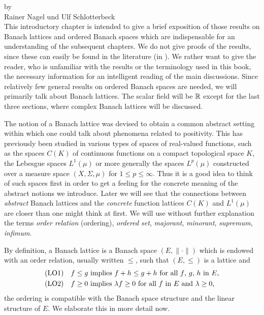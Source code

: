 \label{chap:c1}%
{\Large
\vspace*{-.75cm}
by \\[.25em]
Rainer Nagel und Ulf Schlotterbeck
\vspace{.75cm}
\\
}
This introductory chapter is intended to give a brief exposition of those results on Banach lattices and ordered Banach spaces which are indispensable for an understanding of the subsequent chapters.
We do not give proofs of the results, since these can easily be found in the literature (\eg in \citet{schaefer:1974}).
We rather want to give the reader, who is unfamiliar with the results or the terminology used in this book, the necessary information for an intelligent reading of the main discussions.
Since relatively few general results on ordered Banach spaces are needed, we will primarily talk about Banach lattices.
The scalar field will be $\mathbb{R}$ except for the last three sections, where complex Banach lattices will be discussed.

The notion of a Banach lattice was devised to obtain a common abstract setting within which one could talk about phenomena related to positivity.
This has previously been studied in various types of spaces of real-valued functions, such as the spaces $ C(K) $ of continuous functions on a compact topological space $ K $, the Lebesgue spaces $ L^{1}(\mu) $ or more generally the spaces $ L^{p}(\mu) $ constructed over a measure space $ (X,\Sigma,\mu) $ for $ 1 \leq p \leq \infty $.
Thus it is a good idea to think of such spaces first in order to get a feeling for the concrete meaning of the abstract notions we introduce.
Later we will see that the connections between \emph{abstract} Banach lattices and the \emph{concrete} function lattices $ C(K) $ and $ L^{1}(\mu) $ are closer than one might think at first.
We will use without further explanation the terms \emph{order relation} (ordering), \emph{ordered set}, \emph{majorant}, \emph{minorant}, \emph{supremum}, \emph{infimum}.

By definition, a Banach lattice is a Banach space $ (E,\|\cdot\|) $ which is endowed with an order relation, usually written $ \leq $, such that $ (E,\leq) $ is a lattice and 
\begin{align*}
 &\mathrm{(LO1)} \quad \text{$f \leq g$ implies $f + h \leq g + h $
 	 for all $ f $, $ g $, $ h $ in  $ E $,}  \\
 &\mathrm{(LO2)} \quad \text{$f \geq 0$  implies   $\lambda f \geq 0$ for all $ f $ in $ E $ 
 	and  $\lambda \geq 0$,}
\end{align*}
\ie the ordering is compatible with the Banach space structure and the linear structure of $ E $.
We elaborate this in more detail now.



